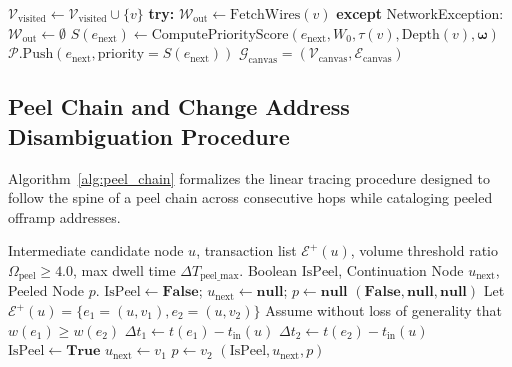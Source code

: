 \begin{algorithm}[H]
\begin{algorithmic}[1]
        \State $\mathcal{V}_{\text{visited}} \gets \mathcal{V}_{\text{visited}} \cup \{v\}$
        \State \textbf{try:} $\mathcal{W}_{\text{out}} \gets \text{FetchWires}(v)$
        \State \textbf{except} NetworkException: $\mathcal{W}_{\text{out}} \gets \emptyset$ 
                \State $S(e_{\text{next}}) \gets \text{ComputePriorityScore}(e_{\text{next}}, W_0, \tau(v), \text{Depth}(v), \mathbf{\omega})$
                    \State $\mathcal{P}.\text{Push}(e_{\text{next}}, \text{priority}=S(e_{\text{next}}))$
                \EndIf
            \EndIf
        \EndFor
    \EndIf
\EndWhile
\State \Return $\mathcal{G}_{\text{canvas}} = (\mathcal{V}_{\text{canvas}}, \mathcal{E}_{\text{canvas}})$
\end{algorithmic}
\end{algorithm}

\subsection{Peel Chain and Change Address Disambiguation Procedure}

Algorithm~\ref{alg:peel_chain} formalizes the linear tracing procedure designed to follow the spine of a peel chain across consecutive hops while cataloging peeled offramp addresses.

\begin{algorithm}[H]
\caption{Peel Chain Disambiguation and Spine Extraction}
\label{alg:peel_chain}
\begin{algorithmic}[1]
\Require Intermediate candidate node $u$, transaction list $\mathcal{E}^+(u)$, volume threshold ratio $\Omega_{\text{peel}} \ge 4.0$, max dwell time $\Delta T_{\text{peel\_max}}$.
\Ensure Boolean $\text{IsPeel}$, Continuation Node $u_{\text{next}}$, Peeled Node $p$.
\State $\text{IsPeel} \gets \mathbf{False}$; $u_{\text{next}} \gets \mathbf{null}$; $p \gets \mathbf{null}$
    \State \Return $(\mathbf{False}, \mathbf{null}, \mathbf{null})$
\EndIf
\State Let $\mathcal{E}^+(u) = \{e_1 = (u, v_1), e_2 = (u, v_2)\}$
\State Assume without loss of generality that $w(e_1) \ge w(e_2)$
    \State $\Delta t_1 \gets t(e_1) - t_{\text{in}}(u)$
    \State $\Delta t_2 \gets t(e_2) - t_{\text{in}}(u)$
        \State $\text{IsPeel} \gets \mathbf{True}$
        \State $u_{\text{next}} \gets v_1$ 
        \State $p \gets v_2$ 
    \EndIf
\EndIf
\State \Return $(\text{IsPeel}, u_{\text{next}}, p)$
\end{algorithmic}
\end{algorithm}

